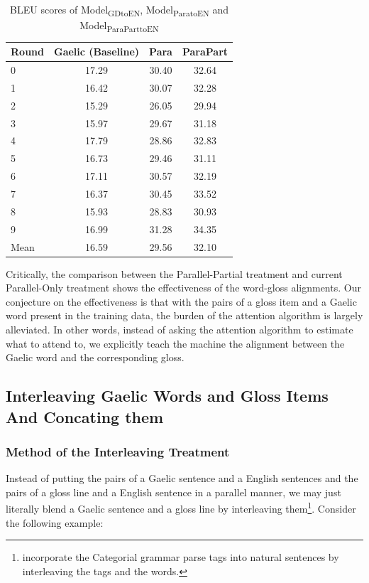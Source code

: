 \documentclass[final]{ua-thesis}
\numberwithin{equation}{section}
\begin{document}
\begin{table}[ht]
\centering
\begin{tabular}{lccc}
  \hline
Round & Gaelic (Baseline) & Para & ParaPart \\ 
  \hline
0 & 17.29 & 30.40 & 32.64 \\ 
  1 & 16.42 & 30.07 & 32.28 \\ 
  2 & 15.29 & 26.05 & 29.94 \\ 
  3 & 15.97 & 29.67 & 31.18 \\ 
  4 & 17.79 & 28.86 & 32.83 \\ 
  5 & 16.73 & 29.46 & 31.11 \\ 
  6 & 17.11 & 30.57 & 32.19 \\ 
  7 & 16.37 & 30.45 & 33.52 \\ 
  8 & 15.93 & 28.83 & 30.93 \\ 
  9 & 16.99 & 31.28 & 34.35 \\ 
   \hline
Mean & 16.59 & 29.56 & 32.10 \\ 
   \hline
\end{tabular}
\caption{BLEU scores of Model\textsubscript{GDtoEN}, Model\textsubscript{ParatoEN} and Model\textsubscript{ParaParttoEN} } 
\label{Table:Concating}
\end{table}
Critically, the comparison between the Parallel-Partial treatment and current Parallel-Only treatment shows the effectiveness of the word-gloss alignments. Our conjecture on the effectiveness is that with the pairs of a gloss item and a Gaelic word present in the training data, the burden of the attention algorithm \citep{bahdanau2014neural} is largely alleviated. In other words, instead of asking the attention algorithm to estimate what to attend to, we explicitly teach the machine the alignment between the Gaelic word and the corresponding gloss. 

\subsection{Interleaving Gaelic Words and Gloss Items And Concating them}\label{treatment:InterleavingAndConCat}
\subsubsection{Method of the Interleaving Treatment}
Instead of putting the pairs of a Gaelic sentence and a English sentences and the pairs of a gloss line and a English sentence in a parallel manner, we may just literally blend a Gaelic sentence and a gloss line by interleaving them\footnote{\citet{ccg_target_seq} incorporate the Categorial grammar parse tags into natural sentences by interleaving the tags and the words.}. Consider the following example:
\end{document}
